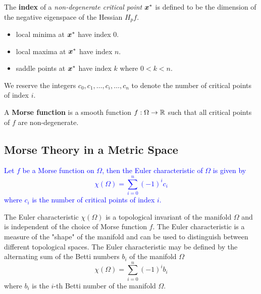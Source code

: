 \documentclass[10pt]{article}
\begin{document}
    \begin{definition}
            The \textbf{index} of a \emph{non-degenerate critical point} $\bm{x}^*$ is defined to be
            the dimension of the negative eigenspace of the Hessian $H_p f$.
            \begin{itemize}
                \item local minima at $\bm{x}^*$ have index $0$.
                \item local maxima at $\bm{x}^*$ have index $n$.
                \item saddle points at $\bm{x}^*$ have index $k$ where $0 < k < n$.
            \end{itemize}
            We reserve the integers $c_0, c_1, \dots, c_i, \dots, c_n$ to denote the number of
            critical points of index $i$.
    \end{definition}

    \begin{definition}
        A \textbf{Morse function} is a smooth function $f : \Omega \rightarrow \mathbb{R}$ such that
        all critical points of $f$ are non-degenerate.
    \end{definition}

\subsection{Morse Theory in a Metric Space}

\begin{theorem}
    \textcolor{Blue}{
        Let $f$ be a Morse function on $\Omega$, then the Euler characteristic of $\Omega$ is
        given by
        $$
            \chi(\Omega) = \sum_{i=0}^n (-1)^i c_i
        $$
        where $c_i$ is the number of critical points of index $i$.
    }
\end{theorem}

\begin{remark}
    The Euler characteristic $\chi(\Omega)$ is a topological invariant of the manifold $\Omega$
    and is independent of the choice of Morse function $f$.
    The Euler characteristic is a measure of the "shape" of the manifold and can be used to
    distinguish between different topological spaces.
    The Euler characteristic may be defined by the alternating sum of the Betti numbers
    $b_i$ of the manifold $\Omega$
    $$
        \chi(\Omega) = \sum_{i=0}^n (-1)^i b_i
    $$
    where $b_i$ is the $i$-th Betti number of the manifold $\Omega$.
\end{remark}
\end{document}
